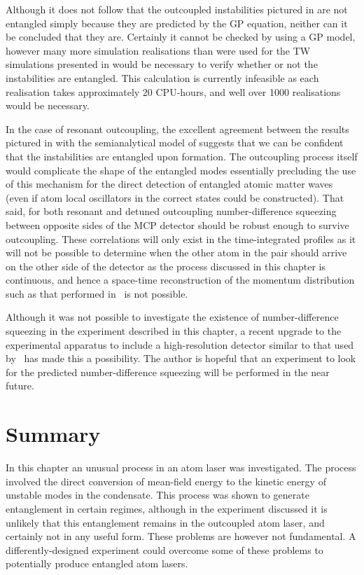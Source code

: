 Although it does not follow that the outcoupled instabilities pictured in  are not entangled simply because they are predicted by the GP equation, neither can it be concluded that they are.  Certainly it cannot be checked by using a GP model, however many more simulation realisations than were used for the TW simulations presented in  would be necessary to verify whether or not the instabilities are entangled.  This calculation is currently infeasible as each realisation takes approximately 20 CPU-hours, and well over 1000 realisations would be necessary.  

In the case of resonant outcoupling, the excellent agreement between the results pictured in  with the semianalytical model of  suggests that we can be confident that the instabilities are entangled upon formation.  The outcoupling process itself would complicate the shape of the entangled modes essentially precluding the use of this mechanism for the direct detection of entangled atomic matter waves (even if atom local oscillators in the correct states could be constructed).  That said, for both resonant and detuned outcoupling number-difference squeezing between opposite sides of the MCP detector should be robust enough to survive outcoupling.  These correlations will only exist in the time-integrated profiles as it will not be possible to determine when the other atom in the pair should arrive on the other side of the detector as the process discussed in this chapter is continuous, and hence a space-time reconstruction of the momentum distribution such as that performed in~\citep{Perrin:2007} is not possible.

Although it was not possible to investigate the existence of number-difference squeezing in the experiment described in this chapter, a recent upgrade to the experimental apparatus to include a high-resolution detector similar to that used by~\citet{Perrin:2007} has made this a possibility.  The author is hopeful that an experiment to look for the predicted number-difference squeezing will be performed in the near future.

\section{Summary}

In this chapter an unusual process in an atom laser was investigated.  The process involved the direct conversion of mean-field energy to the kinetic energy of unstable modes in the condensate.  This process was shown to generate entanglement in certain regimes, although in the experiment discussed it is unlikely that this entanglement remains in the outcoupled atom laser, and certainly not in any useful form.  These problems are however not fundamental.  A differently-designed experiment could overcome some of these problems to potentially produce entangled atom lasers.

